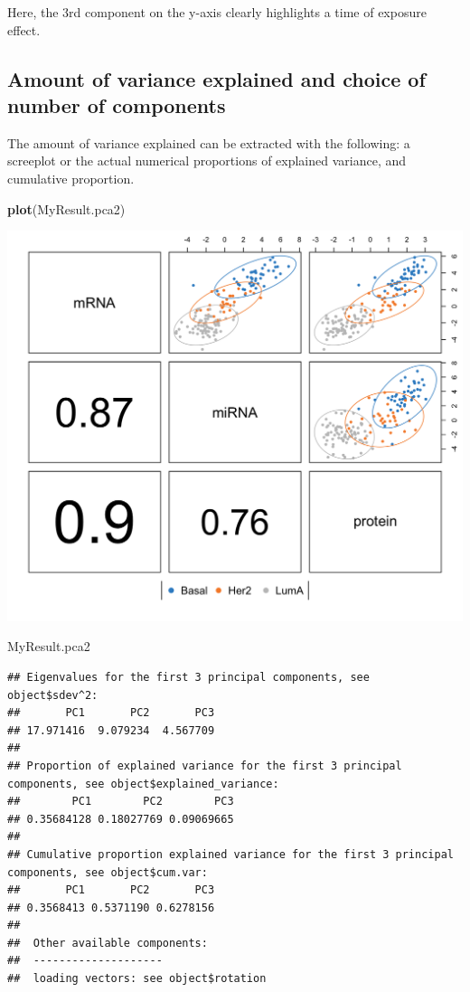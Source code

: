\documentclass[]{book}
\newenvironment{Shaded}{\begin{snugshade}}{\end{snugshade}}
\newcommand{\KeywordTok}[1]{\textcolor[rgb]{0.13,0.29,0.53}{\textbf{#1}}}
\newcommand{\NormalTok}[1]{#1}
\theoremstyle{definition}
\theoremstyle{definition}
\theoremstyle{definition}
\theoremstyle{remark}
\begin{document}
Here, the 3rd component on the y-axis clearly highlights a time of
exposure effect.

\subsection{Amount of variance explained and choice of number of
components}\label{amount-of-variance-explained-and-choice-of-number-of-components}

The amount of variance explained can be extracted with the following: a
screeplot or the actual numerical proportions of explained variance, and
cumulative proportion.

\begin{Shaded}
\begin{Highlighting}[]
\KeywordTok{plot}\NormalTok{(MyResult.pca2)}
\end{Highlighting}
\end{Shaded}

\begin{center}\includegraphics[width=0.5\linewidth]{Figures/unnamed-chunk-6-1} \end{center}

\begin{Shaded}
\begin{Highlighting}[]
\NormalTok{MyResult.pca2}
\end{Highlighting}
\end{Shaded}

\begin{verbatim}
## Eigenvalues for the first 3 principal components, see object$sdev^2: 
##       PC1       PC2       PC3 
## 17.971416  9.079234  4.567709 
## 
## Proportion of explained variance for the first 3 principal components, see object$explained_variance: 
##        PC1        PC2        PC3 
## 0.35684128 0.18027769 0.09069665 
## 
## Cumulative proportion explained variance for the first 3 principal components, see object$cum.var: 
##       PC1       PC2       PC3 
## 0.3568413 0.5371190 0.6278156 
## 
##  Other available components: 
##  -------------------- 
##  loading vectors: see object$rotation
\end{verbatim}
\end{document}
